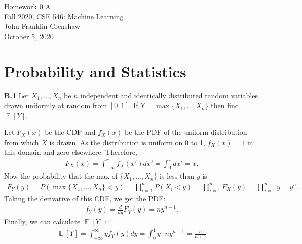 \documentclass{article}
\DeclareMathOperator{\E}{\mathbb{E}}
\newenvironment{solution}{\begin{adjustwidth}{8mm}{}}{\end{adjustwidth}}
\renewcommand{\title}{Homework 0 A}
\renewcommand{\date}{October 5, 2020}
\begin{document}
\newpage


\begin{center}
        \LARGE \title \\ \vspace{10pt}
        \normalsize 
        Fall 2020, CSE 546: Machine Learning \\ \vspace{2pt}
        John Franklin Crenshaw \\ \vspace{2pt}
        \date
\end{center}


\section*{Probability and Statistics}

\textbf{B.1}
Let $X_1,\dots,X_n$ be $n$ independent and identically distributed random variables drawn uniformly at random from $[0,1]$.
If $Y = \max \{X_1,\dots,X_n\}$ then find $\E[Y]$. \newline

\begin{solution}
        Let $F_X(x)$ be the CDF and $f_X(x)$ be the PDF of the uniform distribution from which $X$ is drawn.
        As the distribution is uniform on 0 to 1, $f_X(x) = 1$ in this domain and zero elsewhere.
        Therefore,
        \begin{align*}
                F_X(x) = \int_{-\infty}^{x} f_X(x') dx' = \int_0^x dx' = x.
        \end{align*}
        Now the probability that the max of $\{X_1,\dots,X_n\}$ is less than $y$ is
        \begin{align*}
                F_Y(y) = P(\max\{X_1,\dots,X_n\} < y) 
                = \prod_{i=1}^n P(X_i < y) 
                = \prod_{i=1}^n F_X(y)
                = \prod_{i=1}^n y
                = y^n.
        \end{align*}
        Taking the derivative of this CDF, we get the PDF:
        \begin{align*}
                f_Y(y) = \frac{d}{dy} F_Y(y) = n y^{n-1}.
        \end{align*}
        Finally, we can calculate $\E[Y]$:
        \begin{align*}
                \E[Y] = \int_{-\infty}^{\infty} y f_Y(y) dy
                = \int_0^1 y \cdot n y^{n-1}
                = \frac{n}{n+1}
        \end{align*}

\end{solution}
\end{document}
